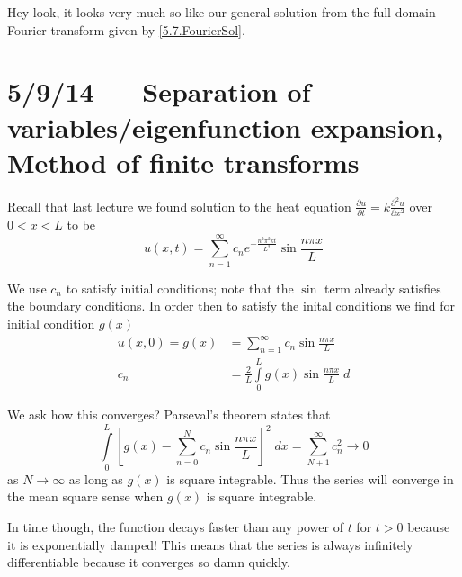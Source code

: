 \documentclass[10pt]{report}
\newcommand{\ptd}[2]{\frac{\partial^2 #1}{\partial#2^2}}
\newcommand{\pd}[2]{\frac{\partial #1}{\partial#2}}
\begin{document}
Hey look, it looks very much so like our general solution from the full domain Fourier transform given by \eqref{5.7.FourierSol}.

\chapter{5/9/14 --- Separation of variables/eigenfunction expansion, Method of finite transforms}

Recall that last lecture we found solution to the heat equation $\pd{u}{t} = k\ptd{u}{x}$ over $0 < x < L$ to be
\begin{equation}
    u(x,t) = \sum_{n=1}^{\infty}c_ne^{-\frac{n^2\pi^2 kt}{L^2}}\sin \frac{n\pi x}{L}
\end{equation}

We use $c_n$ to satisfy initial conditions; note that the $\sin$ term already satisfies the boundary conditions. In order then to satisfy the inital conditions we find for initial condition $g(x)$
\begin{align}
    u(x,0) = g(x) &= \sum_{n=1}^{\infty} c_n \sin \frac{n\pi x}{L}\\
    c_n &= \frac{2}{L}\int\limits_{0}^{L}g(x)\sin \frac{n\pi x}{L}\;d
\end{align}

We ask how this converges? Parseval's theorem states that
\begin{equation}
    \int\limits_{0}^{L}\left[ g(x) - \sum_{n=0}^{N}c_n\sin \frac{n\pi x}{L} \right]^2\;dx = \sum_{N+1}^{\infty}c_n^2 \to 0
\end{equation}
as $N \to \infty$ as long as $g(x)$ is square integrable. Thus the series will converge in the mean square sense when $g(x)$ is square integrable.

In time though, the function decays faster than any power of $t$ for $t > 0$ because it is exponentially damped! This means that the series is always infinitely differentiable because it converges so damn quickly.
\end{document}
